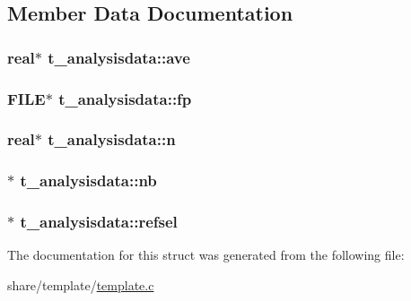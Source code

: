 \subsection{\-Member \-Data \-Documentation}
\hypertarget{structt__analysisdata_ac9b65d94013c007d7ac17a787c39de76}{
\subsubsection[{ave}]{\setlength{\rightskip}{0pt plus 5cm}real$\ast$ {\bf t\-\_\-analysisdata\-::ave}}}\label{structt__analysisdata_ac9b65d94013c007d7ac17a787c39de76}
\hypertarget{structt__analysisdata_ab114cc7b33c2bae2cee4006a997d0f72}{
\subsubsection[{fp}]{\setlength{\rightskip}{0pt plus 5cm}\-F\-I\-L\-E$\ast$ {\bf t\-\_\-analysisdata\-::fp}}}\label{structt__analysisdata_ab114cc7b33c2bae2cee4006a997d0f72}
\hypertarget{structt__analysisdata_a875c6d6ab7ae92bcdbde52ada54e669c}{
\subsubsection[{n}]{\setlength{\rightskip}{0pt plus 5cm}real$\ast$ {\bf t\-\_\-analysisdata\-::n}}}\label{structt__analysisdata_a875c6d6ab7ae92bcdbde52ada54e669c}
\hypertarget{structt__analysisdata_a7d6814eff8dd6d3f7057451326e10e78}{
\subsubsection[{nb}]{$\ast$ {\bf t\-\_\-analysisdata\-::nb}}}\label{structt__analysisdata_a7d6814eff8dd6d3f7057451326e10e78}
\hypertarget{structt__analysisdata_afb1f31508d0f8d49e2386d3653fbdf0b}{
\subsubsection[{refsel}]{$\ast$ {\bf t\-\_\-analysisdata\-::refsel}}}\label{structt__analysisdata_afb1f31508d0f8d49e2386d3653fbdf0b}


\-The documentation for this struct was generated from the following file\-:\begin{DoxyCompactItemize}
\item 
share/template/\hyperlink{template_8c}{template.\-c}\end{DoxyCompactItemize}
